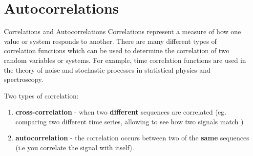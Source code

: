 \section{Autocorrelations}


\begin{frame}{Correlations and Autocorrelations}
Correlations represent a measure of how one value or system responds to another. There are many different types of correlation functions which can be used to determine the correlation of two random variables or systems. For example, time correlation functions are used in the theory of noise and stochastic processes in statistical physics and spectroscopy. \par 

Two types of correlation:
\begin{enumerate}
	\item {\bf cross-correlation} - when two {\bf different} sequences are correlated (eg. comparing two different time series, allowing to see how two signals match )
	\item {\bf autocorrelation} - the correlation occurs between two of the {\bf same} sequences (i.e you correlate the signal with itself).
\end{enumerate}
\end{frame}


